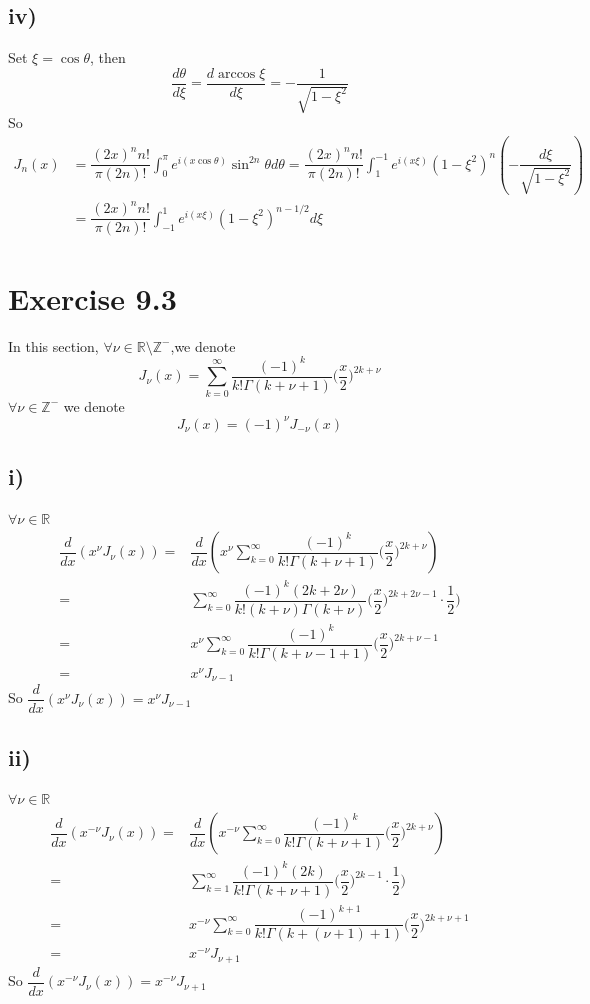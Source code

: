 \documentclass[a4paper,12pt,titlepage]{article}
\begin{document}
\subsection*{iv)}
Set $\xi=\cos\theta$, then 
$$\dfrac{d\theta}{d\xi}=\dfrac{d\arccos\xi}{d\xi}=-\dfrac{1}{\sqrt{1-\xi^2}}$$
So
\begin{align*}
J_n(x)&=\dfrac{(2x)^nn!}{\pi(2n)!}\int_0^{\pi}e^{i(x\cos\theta)}\sin^{2n}\theta d\theta=\dfrac{(2x)^nn!}{\pi(2n)!}\int_1^{-1}e^{i(x\xi)}(1-\xi^2)^n (-\dfrac{d\xi}{\sqrt{1-\xi^2}})\\
&=\dfrac{(2x)^nn!}{\pi(2n)!}\int_{-1}^{1}e^{i(x\xi)}(1-\xi^2)^{n-1/2} d\xi
\end{align*}
\section*{Exercise 9.3}
In this section, $\forall \nu\in\mathbb{R}\setminus\mathbb{Z}^-$,we denote
$$J_{\nu}(x)=\sum\limits_{k=0}^{\infty}\dfrac{(-1)^k}{k!\Gamma(k+\nu+1)}\Big(\dfrac{x}{2}\Big)^{2k+\nu}$$
$\forall \nu\in\mathbb{Z}^-$ we denote
$$J_{\nu}(x)=(-1)^{\nu}J_{-\nu}(x)$$
\subsection*{i)}
$\forall\nu\in\mathbb{R}$
\begin{align*}
\dfrac{d}{dx}(x^{\nu}J_{\nu}(x))=&\dfrac{d}{dx}(x^{\nu}\sum\limits_{k=0}^{\infty}\dfrac{(-1)^k}{k!\Gamma(k+\nu+1)}\Big(\dfrac{x}{2}\Big)^{2k+\nu})\\
=&\sum\limits_{k=0}^{\infty}\dfrac{(-1)^k(2k+2\nu)}{k!(k+\nu)\Gamma(k+\nu)}\Big(\dfrac{x}{2}\Big)^{2k+2\nu-1}\cdot\dfrac{1}{2})\\
=&x^{\nu}\sum\limits_{k=0}^{\infty}\dfrac{(-1)^k}{k!\Gamma(k+\nu-1+1)}\Big(\dfrac{x}{2}\Big)^{2k+\nu-1}\\
=&x^{\nu}J_{\nu-1}
\end{align*}
So $\dfrac{d}{dx}(x^{\nu}J_{\nu}(x))=x^{\nu}J_{\nu-1}$

\subsection*{ii)}
$\forall\nu\in\mathbb{R}$
\begin{align*}
\dfrac{d}{dx}(x^{-\nu}J_{\nu}(x))=&\dfrac{d}{dx}(x^{-\nu}\sum\limits_{k=0}^{\infty}\dfrac{(-1)^k}{k!\Gamma(k+\nu+1)}\Big(\dfrac{x}{2}\Big)^{2k+\nu})\\
=&\sum\limits_{k=1}^{\infty}\dfrac{(-1)^k(2k)}{k!\Gamma(k+\nu+1)}\Big(\dfrac{x}{2}\Big)^{2k-1}\cdot\dfrac{1}{2})\\
=&x^{-\nu}\sum\limits_{k=0}^{\infty}\dfrac{(-1)^{k+1}}{k!\Gamma(k+(\nu+1)+1)}\Big(\dfrac{x}{2}\Big)^{2k+\nu+1}\\
=&x^{-\nu}J_{\nu+1}
\end{align*}
So $\dfrac{d}{dx}(x^{-\nu}J_{\nu}(x))=x^{-\nu}J_{\nu+1}$
\end{document}
